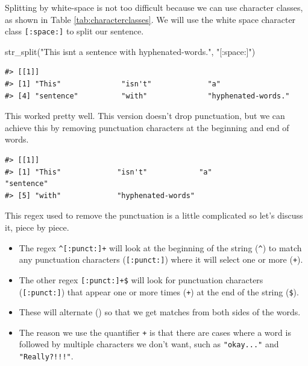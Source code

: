 \documentclass[
]{krantz}
\makeatletter
\newenvironment{Shaded}{\begin{snugshade}}{\end{snugshade}}
\newcommand{\FunctionTok}[1]{\textcolor[rgb]{0.00,0.00,0.00}{#1}}
\newcommand{\NormalTok}[1]{#1}
\newcommand{\SpecialCharTok}[1]{\textcolor[rgb]{0.00,0.00,0.00}{#1}}
\newcommand{\StringTok}[1]{\textcolor[rgb]{0.31,0.60,0.02}{#1}}
\newenvironment{kframe}{%
\medskip{}
\setlength{\fboxsep}{.8em}
 \def\at@end@of@kframe{}%
 \ifinner\ifhmode%
  \def\at@end@of@kframe{\end{minipage}}%
  \begin{minipage}{\columnwidth}%
 \fi\fi%
 \def\FrameCommand##1{\hskip\@totalleftmargin \hskip-\fboxsep
 \colorbox{shadecolor}{##1}\hskip-\fboxsep
     \hskip-\linewidth \hskip-\@totalleftmargin \hskip\columnwidth}%
 \MakeFramed {\advance\hsize-\width
   \@totalleftmargin\z@ \linewidth\hsize
   \@setminipage}}%
 {\par\unskip\endMakeFramed%
 \at@end@of@kframe}
\renewenvironment{Shaded}{\begin{kframe}}{\end{kframe}}
\makeatother
\begin{document}
Splitting by white-space is not too difficult because we can use character classes, as shown in Table \ref{tab:characterclasses}. We will use the white space character class \texttt{{[}:space:{]}} to split our sentence.

\begin{Shaded}
\begin{Highlighting}[]
\FunctionTok{str\_split}\NormalTok{(}\StringTok{"This isn\textquotesingle{}t a sentence with hyphenated{-}words."}\NormalTok{, }\StringTok{"[:space:]"}\NormalTok{)}
\end{Highlighting}
\end{Shaded}

\begin{verbatim}
#> [[1]]
#> [1] "This"              "isn't"             "a"                
#> [4] "sentence"          "with"              "hyphenated-words."
\end{verbatim}

This worked pretty well. This version doesn't drop punctuation, but we can achieve this by removing punctuation characters at the beginning and end of words.

\begin{Shaded}
\end{Shaded}

\begin{verbatim}
#> [[1]]
#> [1] "This"             "isn't"            "a"                "sentence"        
#> [5] "with"             "hyphenated-words"
\end{verbatim}

This regex used to remove the punctuation is a little complicated so let's discuss it, piece by piece.

\begin{itemize}
\item
  The regex \texttt{\^{}{[}:punct:{]}+} will look at the beginning of the string (\texttt{\^{}}) to match any punctuation characters (\texttt{{[}:punct:{]}}) where it will select one or more (\texttt{+}).
\item
  The other regex \texttt{{[}:punct:{]}+\$} will look for punctuation characters (\texttt{{[}:punct:{]}}) that appear one or more times (\texttt{+}) at the end of the string (\texttt{\$}).
\item
  These will alternate (\texttt{\textbar{}}) so that we get matches from both sides of the words.
\item
  The reason we use the quantifier \texttt{+} is that there are cases where a word is followed by multiple characters we don't want, such as \texttt{"okay..."} and \texttt{"Really?!!!"}.
\end{itemize}
\end{document}
